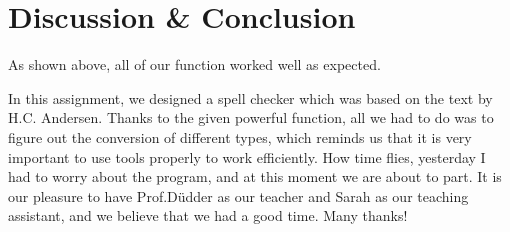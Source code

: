\documentclass{article}
\begin{document}
\section{Discussion \& Conclusion}

As shown above, all of our function worked well as expected.

In this assignment, we designed a spell checker which was based on the text by H.C. Andersen. Thanks to the given powerful function, all we had to do was to figure out the conversion of different types, which reminds us that it is very important to use tools properly to work efficiently. How time flies, yesterday I had to worry about the program, and at this moment we are about to part. It is our pleasure to have Prof.Düdder as our teacher and Sarah as our teaching assistant, and we believe that we had a good time. Many thanks!



% 
% 




\end{document}
